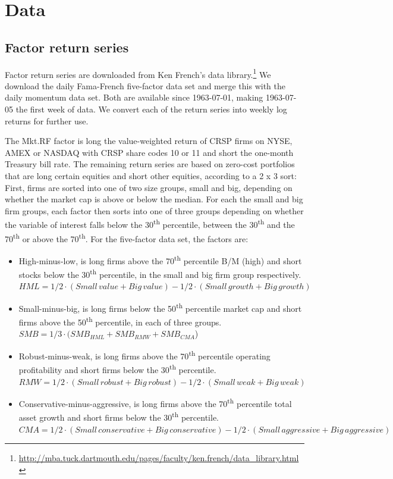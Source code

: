 \section{Data}
\subsection{Factor return series}
Factor return series are downloaded from Ken French's data library.\footnote{\url{http://mba.tuck.dartmouth.edu/pages/faculty/ken.french/data_library.html}} We download the daily Fama-French five-factor data set and merge this with the daily momentum data set. Both are available since 1963-07-01, making 1963-07-05 the first week of data. We convert each of the return series into weekly log returns for further use. 

The Mkt.RF factor is long the value-weighted return of CRSP firms on NYSE, AMEX or NASDAQ with CRSP share codes 10 or 11 and short the one-month Treasury bill rate. The remaining return series are based on zero-cost portfolios that are long certain equities and short other equities, according to a 2 x 3 sort: First, firms are sorted into one of two size groups, small and big, depending on whether the market cap is above or below the median. For each the small and big firm groups, each factor then sorts into one of three groups depending on whether the variable of interest falls below the 30\textsuperscript{th} percentile, between the 30\textsuperscript{th} and the 70\textsuperscript{th} or above the 70\textsuperscript{th}. For the five-factor data set, the factors are:
\begin{itemize}
  \item High-minus-low, is long firms above the 70\textsuperscript{th} percentile B/M (high) and short stocks below the 30\textsuperscript{th} percentile, in the small and big firm group respectively. \\
  $HML = 1/2 \cdot (Small\,value + Big\,value) - 1/2 \cdot (Small\,growth + Big\,growth)$
  \item Small-minus-big, is long firms below the 50\textsuperscript{th} percentile market cap and short firms above the 50\textsuperscript{th} percentile, in each of three groups. \\
  $SMB = 1/3 \cdot (SMB_{HML} + SMB_{RMW} + SMB_{CMA}$)
  \item Robust-minus-weak, is long firms above the 70\textsuperscript{th} percentile operating profitability and short firms below the 30\textsuperscript{th} percentile. \\
  $RMW = 1/2 \cdot (Small\,robust + Big\,robust) - 1/2 \cdot (Small\,weak + Big\,weak)$
  \item Conservative-minus-aggressive, is long firms above the 70\textsuperscript{th} percentile total asset growth and short firms below the 30\textsuperscript{th} percentile. \\
  $CMA = 1/2 \cdot (Small\,conservative + Big\,conservative) - 1/2 \cdot (Small\,aggressive + Big\,aggressive)$
\end{itemize}
